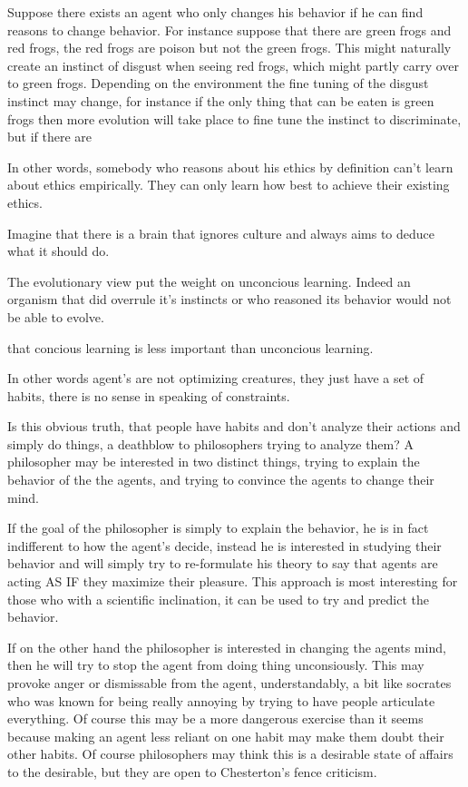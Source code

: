 Suppose there exists an agent who only changes his behavior if he can find reasons to change behavior. For instance suppose that there are green frogs and red frogs, the red frogs are poison but not the green frogs. This might naturally create an instinct of disgust when seeing red frogs, which might partly carry over to green frogs. Depending on the environment the fine tuning of the disgust instinct may change, for instance if the only thing that can be eaten is green frogs then more evolution will take place to fine tune the instinct to discriminate, but if there are 

In other words, somebody who reasons about his ethics by definition can't learn about ethics empirically. They can only learn how best to achieve their existing ethics. 

Imagine that there is a brain that ignores culture and always aims to deduce what it should do. 

The evolutionary view put the weight on unconcious learning. Indeed an organism that did overrule it's instincts or who reasoned its behavior would not be able to evolve. 

 that concious learning is less important than unconcious learning. 

 In other words agent's are not optimizing creatures, they just have a set of habits, there is no sense in speaking of constraints. 

Is this obvious truth, that people have habits and don't analyze their actions and simply do things, a deathblow to philosophers trying to analyze them? A philosopher may be interested in two distinct things, trying to explain the behavior of the the agents, and trying to convince the agents to change their mind. 

If the goal of the philosopher is simply to explain the behavior, he is in fact indifferent to how the agent's decide, instead he is interested in studying their behavior and will simply try to re-formulate his theory to say that agents are acting AS IF they maximize their pleasure. This approach is most interesting for those who with a scientific inclination, it can be used to try and predict the behavior. 

If on the other hand the philosopher is interested in changing the agents mind, then he will try to stop the agent from doing thing unconsiously. This may provoke anger or dismissable from the agent, understandably, a bit like socrates who was known for being really annoying by trying to have people articulate everything. Of course this may be a more dangerous exercise than it seems because making an agent less reliant on one habit may make them doubt their other habits. Of course philosophers may think this is a desirable state of affairs to the desirable, but they are open to Chesterton's fence criticism. 

